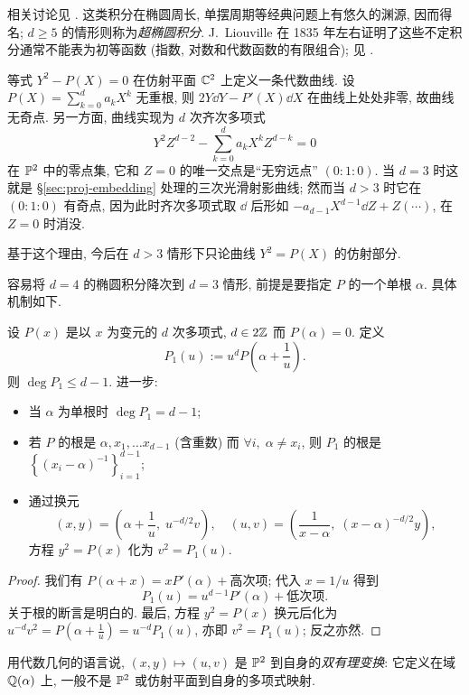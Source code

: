 相关讨论见 \cite[\S 8.1, \S 10.8]{GW}. 这类积分在椭圆周长, 单摆周期等经典问题上有悠久的渊源, 因而得名; $d \geq 5$ 的情形则称为\emph{超椭圆积分}. J.\ Liouville 在 1835 年左右证明了这些不定积分通常不能表为初等函数 (指数, 对数和代数函数的有限组合); 见 \cite{Co05}.

\begin{remark}\label{rem:hyperell-sing}
	等式 $Y^2 - P(X) = 0$ 在仿射平面 $\mathbb{C}^2$ 上定义一条代数曲线. 设 $P(X) = \sum_{k=0}^d a_k X^k$ 无重根, 则 $2 Y\dd Y - P'(X) \dd X$ 在曲线上处处非零, 故曲线无奇点. 另一方面, 曲线实现为 $d$ 次齐次多项式
	\[ Y^2 Z^{d-2} - \sum_{k=0}^d a_k X^k Z^{d-k} = 0 \]
	在 $\mathbb{P}^2$ 中的零点集, 它和 $Z=0$ 的唯一交点是``无穷远点'' $(0:1:0)$. 当 $d = 3$ 时这就是 \S\ref{sec:proj-embedding} 处理的三次光滑射影曲线; 然而当 $d > 3$ 时它在 $(0:1:0)$ 有奇点, 因为此时齐次多项式取 $\dd$ 后形如 $-a_{d-1} X^{d-1} \dd Z + Z(\cdots)$, 在 $Z=0$ 时消没.

	基于这个理由, 今后在 $d > 3$ 情形下只论曲线 $Y^2 = P(X)$ 的仿射部分.
\end{remark}

容易将 $d = 4$ 的椭圆积分降次到 $d = 3$ 情形, 前提是要指定 $P$ 的一个单根 $\alpha$. 具体机制如下.
\begin{lemma}\label{prop:degree-lowering}
	设 $P(x)$ 是以 $x$ 为变元的 $d$ 次多项式, $d \in 2\mathbb{Z}$ 而 $P(\alpha)=0$. 定义
	\[ P_1(u) := u^d P \left( \alpha + \frac{1}{u} \right). \]
	则 $\deg P_1 \leq d-1$. 进一步:
	\begin{itemize}
		\item 当 $\alpha$ 为单根时 $\deg P_1 = d-1$;
		\item 若 $P$ 的根是 $\alpha, x_1, \ldots x_{d-1}$ (含重数) 而 $\forall i,\; \alpha \neq x_i$, 则 $P_1$ 的根是 $\left\{ (x_i - \alpha)^{-1}\right\}_{i=1}^{d-1}$;
		\item 通过换元
			\[ (x,y) = \left( \alpha + \dfrac{1}{u}, \; u^{-d/2} v \right), \quad (u,v) = \left( \dfrac{1}{x - \alpha}, \; (x - \alpha)^{-d/2} y \right), \]
			方程 $y^2 = P(x)$ 化为 $v^2 = P_1(u)$.
	\end{itemize}
\end{lemma}
\begin{proof}
	我们有 $P(\alpha + x) = x P'(\alpha) + \text{高次项}$; 代入 $x = 1/u$ 得到
	\[ P_1(u) =  u^{d-1} P'(\alpha) + \text{低次项}. \]
	关于根的断言是明白的. 最后, 方程 $y^2 = P(x)$ 换元后化为 $u^{-d} v^2 = P\left(\alpha + \frac{1}{u}\right) = u^{-d} P_1(u)$, 亦即 $v^2 = P_1(u)$; 反之亦然.
\end{proof}

用代数几何的语言说, $(x,y) \mapsto (u,v)$ 是 $\mathbb{P}^2$ 到自身的\emph{双有理变换}: 它定义在域 $\mathbb{Q}(\alpha)$ 上, 一般不是 $\mathbb{P}^2$ 或仿射平面到自身的多项式映射. 

